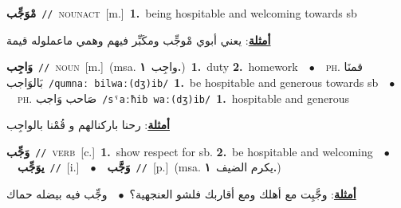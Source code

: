 \documentclass[10pt,a4paper,twoside]{article} %
\begin{document}
\begin{multicols}{2}
{{{{{{{{\setlength\topsep{0pt}\textbf{\foreignlanguage{arabic}{مْوَجِّب}}\ {\color{gray}\texttt{//}\color{black}}\ \textsc{noun\textunderscore act}\ [m.]\ \textbf{1.}~being  hospitable and welcoming towards sb\  \begin{flushright}\color{gray}\foreignlanguage{arabic}{\textbf{\underline{\foreignlanguage{arabic}{أمثلة}}}: يعني أبوي مْوجِّب ومكَبِّر فيهم وهمي ماعملوله قيمة}\end{flushright}\color{black}} \vspace{2mm}

{\setlength\topsep{0pt}\textbf{\foreignlanguage{arabic}{وَاجِب}}\ {\color{gray}\texttt{//}\color{black}}\ \textsc{noun}\ [m.]\ \color{gray}(msa. \foreignlanguage{arabic}{واجِب}~\foreignlanguage{arabic}{\textbf{١.}})\color{black}\ \textbf{1.}~duty  \textbf{2.}~homework\ \ $\bullet$\ \ \textsc{ph.} \color{gray} \foreignlanguage{arabic}{قمنَا بَالوَاجب}\color{black}\ {\color{gray}\texttt{/{\sffamily qumnaː bilwaː(dʒ)ib}/}\color{black}}\ \textbf{1.}~be hospitable and generous towards sb\ \ $\bullet$\ \ \textsc{ph.} \color{gray} \foreignlanguage{arabic}{صَاحب وَاجب}\color{black}\ {\color{gray}\texttt{/{\sffamily sˤaːħib waː(dʒ)ib}/}\color{black}}\ \textbf{1.}~hospitable and generous\  \begin{flushright}\color{gray}\foreignlanguage{arabic}{\textbf{\underline{\foreignlanguage{arabic}{أمثلة}}}: رحنا باركنالهم و قُمْنا بالواجِب}\end{flushright}\color{black}} \vspace{2mm}

{\setlength\topsep{0pt}\textbf{\foreignlanguage{arabic}{وَجِّب}}\ {\color{gray}\texttt{//}\color{black}}\ \textsc{verb}\ [c.]\ \textbf{1.}~show respect for sb.  \textbf{2.}~be hospitable and welcoming\ \ $\bullet$\ \ \setlength\topsep{0pt}\textbf{\foreignlanguage{arabic}{يوَجِّب}}\ {\color{gray}\texttt{//}\color{black}}\ [i.]\ \ $\bullet$\ \ \setlength\topsep{0pt}\textbf{\foreignlanguage{arabic}{وَجَّب}}\ {\color{gray}\texttt{//}\color{black}}\ [p.]\ \color{gray}(msa. \foreignlanguage{arabic}{يكرم الضيف}~\foreignlanguage{arabic}{\textbf{١.}})\color{black}\  \begin{flushright}\color{gray}\foreignlanguage{arabic}{\textbf{\underline{\foreignlanguage{arabic}{أمثلة}}}: وجَّبِت مع أهلك ومع أقاربك فلشو العنجهية؟\ $\bullet$\ \  وجِّب فيه بيضله حماك}\end{flushright}\color{black}} \vspace{2mm}

}}}}}}}
\end{multicols}
\end{document}
